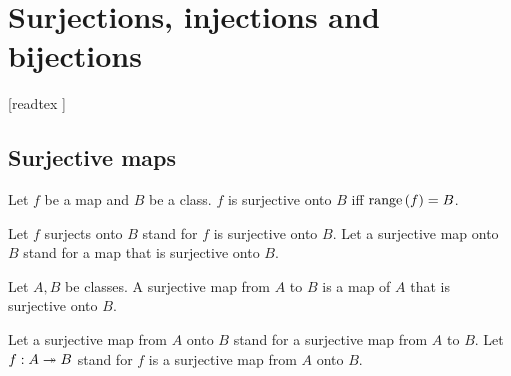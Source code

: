 \documentclass[../../set-theory/set-theory.tex]{subfiles}
\begin{document}
  \chapter{Surjections, injections and bijections}\label{chapter:injections-surjections-bijections}


  \begin{forthel}

    [readtex ]

  \end{forthel}


  \section{Surjective maps}

  \begin{forthel}
    \begin{definition}
      Let $f$ be a map and $B$ be a class.
      $f$ is surjective onto $B$ iff $\mathrm{range}\left(f\right) = B$.
    \end{definition}

    Let $f$ surjects onto $B$ stand for $f$ is surjective onto $B$.
    Let a surjective map onto $B$ stand for a map that is surjective onto $B$.
  \end{forthel}

  \begin{forthel}
    \begin{definition}
      Let $A, B$ be classes.
      A surjective map from $A$ to $B$ is a map of $A$ that is surjective onto
      $B$.
    \end{definition}

    Let a surjective map from $A$ onto $B$ stand for a surjective map from $A$
    to $B$.
    Let $f: A \twoheadrightarrow B$ stand for $f$ is a surjective map from $A$ onto $B$.
  \end{forthel}
\end{document}
